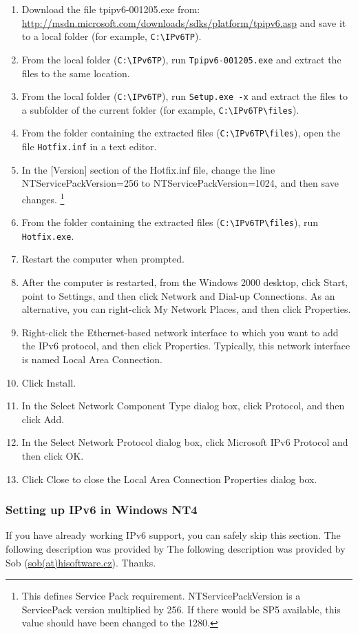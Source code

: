 \begin{enumerate}
  \item Download the file tpipv6-001205.exe from:
    \url{http://msdn.microsoft.com/downloads/sdks/platform/tpipv6.asp}
    and save it to a local folder (for example, \verb+C:\IPv6TP+).
  \item From the local folder (\verb+C:\IPv6TP+), run \verb+Tpipv6-001205.exe+ and extract the
    files to the same location.
  \item From the local folder (\verb+C:\IPv6TP+), run \verb+Setup.exe -x+ and extract the files to
    a subfolder of the current folder (for example, \verb+C:\IPv6TP\files+).
  \item From the folder containing the extracted files (\verb+C:\IPv6TP\files+), open the
    file \verb+Hotfix.inf+ in a text editor.
  \item In the [Version] section of the Hotfix.inf file, change the line
    NTServicePackVersion=256 to NTServicePackVersion=1024, and then
    save changes. \footnote{This defines Service Pack requirement.
      NTServicePackVersion is a ServicePack version multiplied by 256. If there
    would be SP5 available, this value should have been changed to the 1280.}
  \item From the folder containing the extracted files (\verb+C:\IPv6TP\files+), run
    \verb+Hotfix.exe+.
  \item Restart the computer when prompted.
  \item After the computer is restarted, from the Windows 2000 desktop, click Start,
    point to Settings, and then click Network and Dial-up Connections. As an
    alternative, you can right-click My Network Places, and then click Properties.
  \item Right-click the Ethernet-based network interface to which you want to add the IPv6
    protocol, and then click Properties. Typically, this network interface is named
    Local Area Connection.
  \item Click Install.
  \item In the Select Network Component Type dialog box, click Protocol, and then
    click Add.
  \item In the Select Network Protocol dialog box, click Microsoft IPv6 Protocol and
    then click OK.
  \item Click Close to close the Local Area Connection Properties
    dialog box.
\end{enumerate}

\subsubsection{Setting up IPv6 in Windows NT4}
If you have already working IPv6 support, you can safely skip this section.
The following description was provided by The following description was provided by Sob
(\href{mailto:sob(at)hisoftware.cz}{sob(at)hisoftware.cz}). Thanks.

